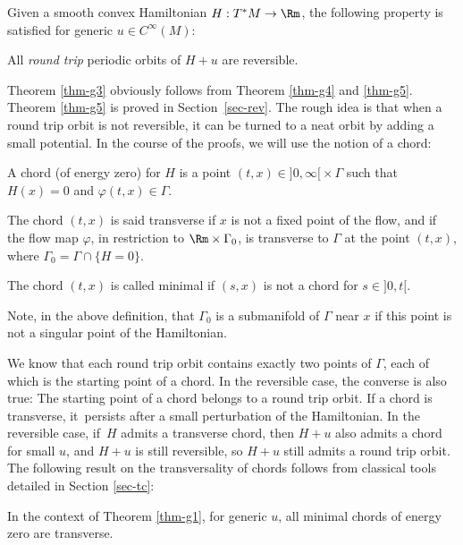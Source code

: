 \begin{thm}\label{thm-g5}
Given a smooth convex Hamiltonian $H: T^*M\rightarrow \Rm$,
the following property is satisfied for generic $u\in C^{\infty}(M)$:

All \emph{round trip} periodic
orbits of $H+u$ are reversible.
\end{thm}

Theorem \ref{thm-g3} obviously follows from Theorem \ref{thm-g4} and \ref{thm-g5}.
Theorem \ref{thm-g5} is proved in Section~\ref{sec-rev}. The rough idea is that when a round trip orbit is not reversible, it can be turned to a neat orbit by adding a small potential.
In the course of the proofs, we will use the notion of a chord:

\begin{defn}
A chord (of energy zero) for $H$ is a point $(t,x)\in{}]0,\infty[{}\times \Gamma$ such that
$H(x)=0$ and $\varphi(t,x)\in \Gamma$.

The chord $(t,x)$ is said transverse if $x$ is not a fixed point of the flow, and if
the flow map $\varphi$, in restriction to
$\Rm\times \Gamma_0$, is transverse to $\Gamma$ at the point $(t,x)$, where $\Gamma_0=\Gamma\cap \{H=0\}$.

The chord $(t,x)$ is called minimal if $(s,x)$ is not a chord for $s\in{}]0,t[$.
\end{defn}

Note, in the above definition, that $\Gamma_0$ is a submanifold of $\Gamma$ near $x$ if this point is not a singular point of
the Hamiltonian.

We know that each round trip orbit contains exactly two points of $\Gamma$, each of which is the starting point of a chord.
In the reversible case, the converse is also true: The starting point of a chord belongs to a round trip orbit.
If a chord is transverse, it~persists after a small perturbation of the Hamiltonian.
In the reversible case, if~$H$ admits a transverse chord, then $H+u$ also admits a chord for small $u$, and $H+u$ is still reversible, so $H+u$ still admits a round trip orbit.
The following result on the transversality of chords follows from classical tools detailed in Section \ref{sec-tc}:

\begin{prop}\label{prop-gen-chord}
In the context of Theorem \ref{thm-g1}, for generic $u$, all minimal chords of energy zero are transverse.
\end{prop}

